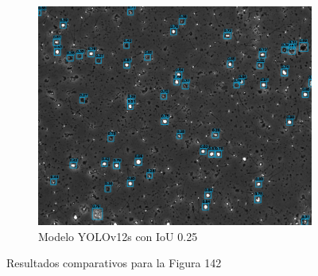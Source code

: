 \documentclass[12pt,a4paper,onecolumn,oneside]{report}
\begin{document}
\begin{figure}[H]
  \vspace{0.3cm}
  \begin{subfigure}[b]{0.48\textwidth}
    \centering
    \includegraphics[width=\textwidth]{figuras/evaluacion_cualitativa/142/142_v12_IoU0.25.jpg}
    \caption{Modelo YOLOv12s con IoU 0.25}
    \label{figyolov12s_IoU0.25_image_142}
  \end{subfigure}

  \caption{Resultados comparativos para la Figura 142}
  \label{fig:142}
\end{figure}
\end{document}
